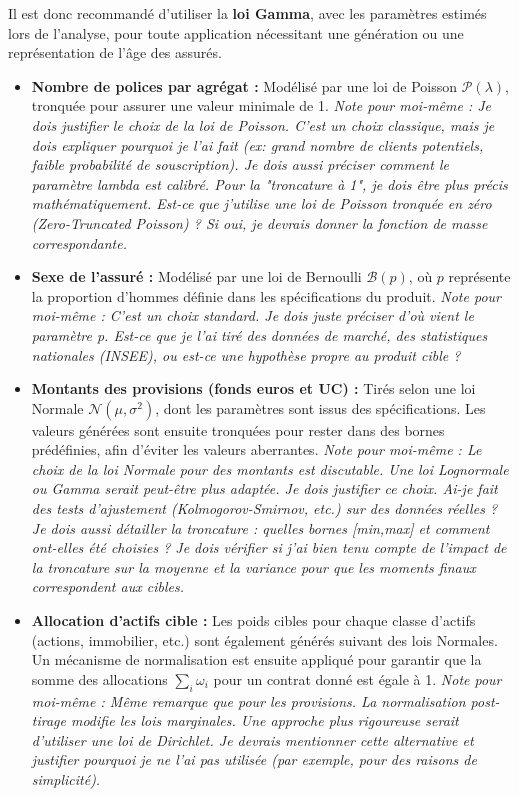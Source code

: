 Il est donc recommandé d'utiliser la \textbf{loi Gamma}, avec les paramètres estimés lors de l'analyse, pour toute application nécessitant une génération ou une représentation de l'âge des assurés.
\begin{itemize}
    \item \textbf{Nombre de polices par agrégat :} Modélisé par une loi de Poisson $\mathcal{P}(\lambda)$, tronquée pour assurer une valeur minimale de 1. \textit{Note pour moi-même : Je dois justifier le choix de la loi de Poisson. C'est un choix classique, mais je dois expliquer pourquoi je l'ai fait (ex: grand nombre de clients potentiels, faible probabilité de souscription). Je dois aussi préciser comment le paramètre lambda est calibré. Pour la "troncature à 1", je dois être plus précis mathématiquement. Est-ce que j'utilise une loi de Poisson tronquée en zéro (Zero-Truncated Poisson) ? Si oui, je devrais donner la fonction de masse correspondante.}
    \item \textbf{Sexe de l'assuré :} Modélisé par une loi de Bernoulli $\mathcal{B}(p)$, où $p$ représente la proportion d'hommes définie dans les spécifications du produit. \textit{Note pour moi-même : C'est un choix standard. Je dois juste préciser d'où vient le paramètre p. Est-ce que je l'ai tiré des données de marché, des statistiques nationales (INSEE), ou est-ce une hypothèse propre au produit cible ?}
    \item \textbf{Montants des provisions (fonds euros et UC) :} Tirés selon une loi Normale $\mathcal{N}(\mu, \sigma^2)$, dont les paramètres sont issus des spécifications. Les valeurs générées sont ensuite tronquées pour rester dans des bornes prédéfinies, afin d'éviter les valeurs aberrantes. \textit{Note pour moi-même : Le choix de la loi Normale pour des montants est discutable. Une loi Lognormale ou Gamma serait peut-être plus adaptée. Je dois justifier ce choix. Ai-je fait des tests d'ajustement (Kolmogorov-Smirnov, etc.) sur des données réelles ? Je dois aussi détailler la troncature : quelles bornes [min,max] et comment ont-elles été choisies ? Je dois vérifier si j'ai bien tenu compte de l'impact de la troncature sur la moyenne et la variance pour que les moments finaux correspondent aux cibles.}
    \item \textbf{Allocation d'actifs cible :} Les poids cibles pour chaque classe d'actifs (actions, immobilier, etc.) sont également générés suivant des lois Normales. Un mécanisme de normalisation est ensuite appliqué pour garantir que la somme des allocations $\sum_{i} \omega_i$ pour un contrat donné est égale à 1. \textit{Note pour moi-même : Même remarque que pour les provisions. La normalisation post-tirage modifie les lois marginales. Une approche plus rigoureuse serait d'utiliser une loi de Dirichlet. Je devrais mentionner cette alternative et justifier pourquoi je ne l'ai pas utilisée (par exemple, pour des raisons de simplicité).}

\end{itemize}
